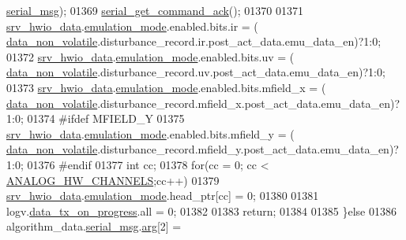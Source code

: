 \begin{DoxyCode}
{{{{{      \hyperlink{a00016_afcf5f557aea688aad985eec15269c1da}{serial\_msg});
01369                          \hyperlink{a00031_a7fc7421ed15d6e4516e9878e7455d715}{serial\_get\_command\_ack}();
01370                          
01371                         \hyperlink{a00034_a0fd91014631926f362c7c2b2f5d143b0}{srv\_hwio\_data}.\hyperlink{a00034_a742dceaef1f19ec73ed5acc066127476}{emulation\_mode}.enabled.bits.ir       = (
      \hyperlink{a00060_a76ac5f917f5308dcd83de0d7c94559fb}{data\_non\_volatile}.disturbance\_record.ir.post\_act\_data.emu\_data\_en)?1:0;
01372                         \hyperlink{a00034_a0fd91014631926f362c7c2b2f5d143b0}{srv\_hwio\_data}.\hyperlink{a00034_a742dceaef1f19ec73ed5acc066127476}{emulation\_mode}.enabled.bits.uv       = (
      \hyperlink{a00060_a76ac5f917f5308dcd83de0d7c94559fb}{data\_non\_volatile}.disturbance\_record.uv.post\_act\_data.emu\_data\_en)?1:0;
01373                         \hyperlink{a00034_a0fd91014631926f362c7c2b2f5d143b0}{srv\_hwio\_data}.\hyperlink{a00034_a742dceaef1f19ec73ed5acc066127476}{emulation\_mode}.enabled.bits.mfield\_x = (
      \hyperlink{a00060_a76ac5f917f5308dcd83de0d7c94559fb}{data\_non\_volatile}.disturbance\_record.mfield\_x.post\_act\_data.emu\_data\_en)?1:0;
01374 \textcolor{preprocessor}{                        #ifdef MFIELD\_Y}
01375                         \hyperlink{a00034_a0fd91014631926f362c7c2b2f5d143b0}{srv\_hwio\_data}.\hyperlink{a00034_a742dceaef1f19ec73ed5acc066127476}{emulation\_mode}.enabled.bits.mfield\_y = (
      \hyperlink{a00060_a76ac5f917f5308dcd83de0d7c94559fb}{data\_non\_volatile}.disturbance\_record.mfield\_y.post\_act\_data.emu\_data\_en)?1:0;
01376 \textcolor{preprocessor}{                        #endif}
01377                         \textcolor{keywordtype}{int} cc;
01378                           \textcolor{keywordflow}{for}(cc = 0; cc < \hyperlink{a00034_ab6ea71f43c4869429695d697be882efe}{ANALOG\_HW\_CHANNELS};cc++)
01379                           \hyperlink{a00034_a0fd91014631926f362c7c2b2f5d143b0}{srv\_hwio\_data}.\hyperlink{a00034_a742dceaef1f19ec73ed5acc066127476}{emulation\_mode}.head\_ptr[cc] = 0;
01380                         
01381                           logv.\hyperlink{a00021_a6cdefde69642ef511e3252c38be68516}{data\_tx\_on\_progress}.all        = 0;
01382                           
01383                         \textcolor{keywordflow}{return};
01384 
01385                         \}\textcolor{keywordflow}{else}
01386                              algorithm\_data.\hyperlink{a00016_afcf5f557aea688aad985eec15269c1da}{serial\_msg}.\hyperlink{a00031_af7d6f762438c80072bd9dc0e4dd4ae1e}{arg}[2] = 
}}}}}
\end{DoxyCode}
